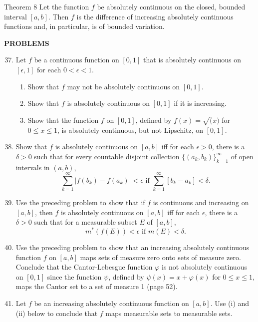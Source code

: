 \begin{namedthm*}{Theorem 8}
    Let the function $f$ be absolutely continuous on the closed, bounded interval $[a,b]$.
    Then $f$ is the difference of increasing absolutely continuous functions and, in particular, is of bounded variation.
\end{namedthm*}

\begin{center}
	\textbf{PROBLEMS}
\end{center}
\begin{enumerate}
	\setcounter{enumi}{36}
    \item Let $f$ be a continuous function on $[0,1]$ that is absolutely continuous on $[\epsilon,1]$ for each $0<\epsilon<1$.
    \begin{enumerate}[label=(\roman*),align=left]
        \item Show that $f$ may not be absolutely continuous on $[0,1]$.
        \item Show that $f$ is absolutely continuous on $[0,1]$ if it is increasing.
        \item Show that the function $f$ on $[0,1]$, defined by $f(x)=\sqrt(x)$ for $0\le x\le1$, is absolutely continuous, but not Lipschitz, on $[0,1]$.
    \end{enumerate}
    \item Show that $f$ is absolutely continuous on $[a,b]$ iff for each $\epsilon>0$, there is a $\delta>0$ such that for every countable disjoint collection $\{(a_k,b_k)\}_{k=1}^\infty$ of open intervals in $(a,b)$,
    \[
        \sum_{k=1}^\infty|f(b_k)-f(a_k)|<\epsilon\text{ if }\sum_{k=1}^\infty[b_k-a_k]<\delta.  
    \]
    \item Use the preceding problem to show that if $f$ is continuous and increasing on $[a,b]$, then $f$ is absolutely continuous on $[a,b]$ iff for each $\epsilon$, there is a $\delta>0$ such that for a measurable subset $E$ of $[a,b]$,
    \[
        m^*(f(E))<\epsilon\text{ if }m(E)<\delta.  
    \]
    \item Use the preceding problem to show that an increasing absolutely continuous function $f$ on $[a,b]$ maps sets of measure zero onto sets of measure zero.
    Conclude that the Cantor-Lebesgue function $\varphi$ is not absolutely continuous on $[0,1]$ since the function $\psi$, defined by $\psi(x)=x+\varphi(x)$ for $0\le x\le1$, maps the Cantor set to a set of measure 1 (page 52).
    \item Let $f$ be an increasing absolutely continuous function on $[a,b]$. Use (i) and (ii) below to conclude that $f$ maps measurable sets to measurable sets.

\end{enumerate}
